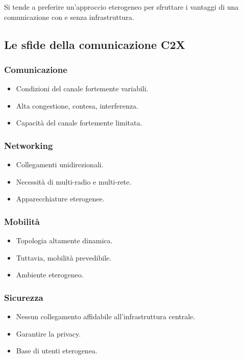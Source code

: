 Si tende a preferire un'approccio eterogeneo per sfruttare i vantaggi di una comunicazione con e
senza infrastruttura.

\subsection{Le sfide della comunicazione C2X}



\subsubsection{Comunicazione}
\begin{itemize}
	\item Condizioni del canale fortemente variabili.
	\item Alta congestione, contesa, interferenza.
	\item Capacità del canale fortemente limitata.
\end{itemize}

\subsubsection{Networking}
\begin{itemize}
	\item Collegamenti unidirezionali.
	\item Necessità di multi-radio e multi-rete.
	\item Apparecchiature eterogenee.
\end{itemize}

\subsubsection{Mobilità}
\begin{itemize}
	\item Topologia altamente dinamica.
	\item Tuttavia, mobilità prevedibile.
	\item Ambiente eterogeneo.
\end{itemize}

\subsubsection{Sicurezza}
\begin{itemize}
	\item Nessun collegamento affidabile all'infrastruttura centrale.
	\item Garantire la privacy.
	\item Base di utenti eterogenea.
\end{itemize}


